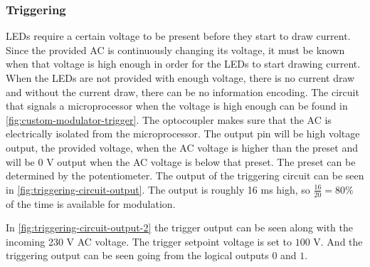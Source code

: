 	\subsubsection{Triggering}

	LEDs require a certain voltage to be present before they start to draw current.
	Since the provided AC is continuously changing its voltage, it must be known when that voltage is high enough in order for the LEDs to start drawing current.
	When the LEDs are not provided with enough voltage, there is no current draw and without the current draw, there can be no information encoding.
	The circuit that signals a microprocessor when the voltage is high enough can be found in \autoref{fig:custom-modulator-trigger}.
	The optocoupler makes sure that the AC is electrically isolated from the microprocessor.
	The output pin will be high voltage output, the provided voltage, when the AC voltage is higher than the preset and will be 0 V output when the AC voltage is below that preset.
	The preset can be determined by the potentiometer.
	The output of the triggering circuit can be seen in \autoref{fig:triggering-circuit-output}.
	The output is roughly 16 ms high, so $\frac{16}{20} = 80 \%$ of the time is available for modulation.
	

	In \autoref{fig:triggering-circuit-output-2} the trigger output can be seen along with the incoming 230 V AC voltage.
	The trigger setpoint voltage is set to $100$ V.
	And the triggering output can be seen going from the logical outputs $0$ and $1$.



